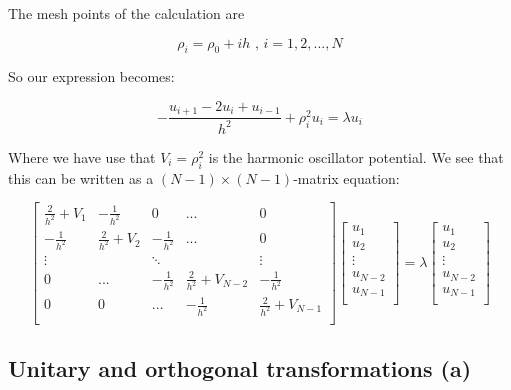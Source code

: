 \documentclass[11pt]{article}
\begin{document}
\begin{flushleft}
The mesh points of the calculation are

\begin{equation*}
\rho_i = \rho_0 + ih \text{ , } i=1,2,...,N
\end{equation*}

So our expression becomes:

\begin{equation}
- \frac{u_{i+1} - 2u_i + u_{i-1}}{h^2} + \rho_i^2 u_i = \lambda u_i
\end{equation}

Where we have use that $V_i = \rho_i^2$ is the harmonic oscillator potential. We see that this can be written as a $(N-1) \times (N-1)$-matrix equation:

\begin{equation*}
\begin{bmatrix}
\frac{2}{h^2} + V_1 & -\frac{1}{h^2} & 0 & ... & 0 \\
-\frac{1}{h^2} & \frac{2}{h^2} + V_2 & -\frac{1}{h^2} & ... & 0\\
\vdots & & \ddots & & \vdots\\
0 & ...  &  -\frac{1}{h^2} & \frac{2}{h^2} + V_{N-2} & -\frac{1}{h^2}\\
0 & 0 & ... & -\frac{1}{h^2} & \frac{2}{h^2} + V_{N-1}\\
\end{bmatrix}
\begin{bmatrix}
u_1\\
u_2\\
\vdots\\
u_{N-2}\\
u_{N-1}\\
\end{bmatrix}
= \lambda
\begin{bmatrix}
u_1\\
u_2\\
\vdots\\
u_{N-2}\\
u_{N-1}\\
\end{bmatrix}
\end{equation*}


\end{flushleft}



\subsection*{Unitary and orthogonal transformations (a)}
\end{document}

